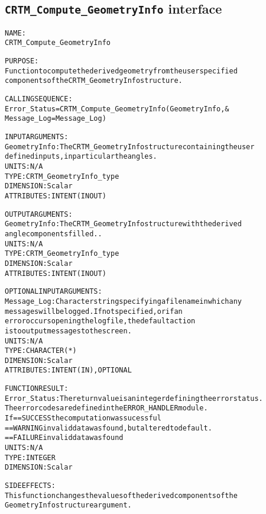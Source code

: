 \subsection{\texttt{CRTM\_Compute\_GeometryInfo} interface}
  \label{sec:CRTM_Compute_GeometryInfo_interface}
  \begin{alltt}
 
  NAME:
        CRTM_Compute_GeometryInfo
  
  PURPOSE:
        Function to compute the derived geometry from the user specified
        components of the CRTM_GeometryInfo structure.
 
  CALLING SEQUENCE:
        Error_Status = CRTM_Compute_GeometryInfo( GeometryInfo           , &
                                                  Message_Log=Message_Log  )
 
  INPUT ARGUMENTS:
        GeometryInfo:  The CRTM_GeometryInfo structure containing the user
                       defined inputs, in particular the angles.
                       UNITS:      N/A
                       TYPE:       CRTM_GeometryInfo_type
                       DIMENSION:  Scalar
                       ATTRIBUTES: INTENT(IN OUT)
 
  OUTPUT ARGUMENTS:
        GeometryInfo:  The CRTM_GeometryInfo structure with the derived
                       angle components filled..
                       UNITS:      N/A
                       TYPE:       CRTM_GeometryInfo_type
                       DIMENSION:  Scalar
                       ATTRIBUTES: INTENT(IN OUT)
 
  OPTIONAL INPUT ARGUMENTS:
        Message_Log:   Character string specifying a filename in which any
                       messages will be logged. If not specified, or if an
                       error occurs opening the log file, the default action
                       is to output messages to the screen.
                       UNITS:      N/A
                       TYPE:       CHARACTER( * )
                       DIMENSION:  Scalar
                       ATTRIBUTES: INTENT( IN ), OPTIONAL
 
  FUNCTION RESULT:
        Error_Status:   The return value is an integer defining the error status.
                        The error codes are defined in the ERROR_HANDLER module.
                        If == SUCCESS the computation was sucessful
                           == WARNING invalid data was found, but altered to default.
                           == FAILURE invalid data was found
                        UNITS:      N/A
                        TYPE:       INTEGER
                        DIMENSION:  Scalar
 
  SIDE EFFECTS:
        This function changes the values of the derived components of the
        GeometryInfo structure argument.
 
  \end{alltt}
